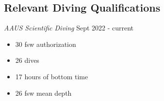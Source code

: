 \documentclass[line,margin]{res}
\begin{document}
\begin{resume}
    \section{Relevant Diving Qualifications}
    {\sl AAUS Scientific Diving} \hfill Sept 2022 - current
    \begin{itemize}
        \item 30 fsw authorization
        \item 26 dives
        \item 17 hours of bottom time
        \item 26 fsw mean depth
    \end{itemize}

\end{resume}
\end{document}
